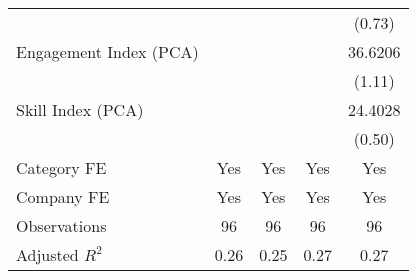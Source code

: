 {\begin{tabular}{l*{4}{c}}
                                   &                   &                   &                   &    (0.73)         \\
[1em]
Engagement Index (PCA)             &                   &                   &                   &   36.6206         \\
                                   &                   &                   &                   &    (1.11)         \\
[1em]
Skill Index (PCA)                  &                   &                   &                   &   24.4028         \\
                                   &                   &                   &                   &    (0.50)         \\
[1em]
Category FE                        &       Yes         &       Yes         &       Yes         &       Yes         \\
[1em]
Company FE                         &       Yes         &       Yes         &       Yes         &       Yes         \\
\hline
Observations                       &        96         &        96         &        96         &        96         \\
Adjusted \(R^{2}\)                 &      0.26         &      0.25         &      0.27         &      0.27         \\
\hline\hline
\end{tabular}
}
